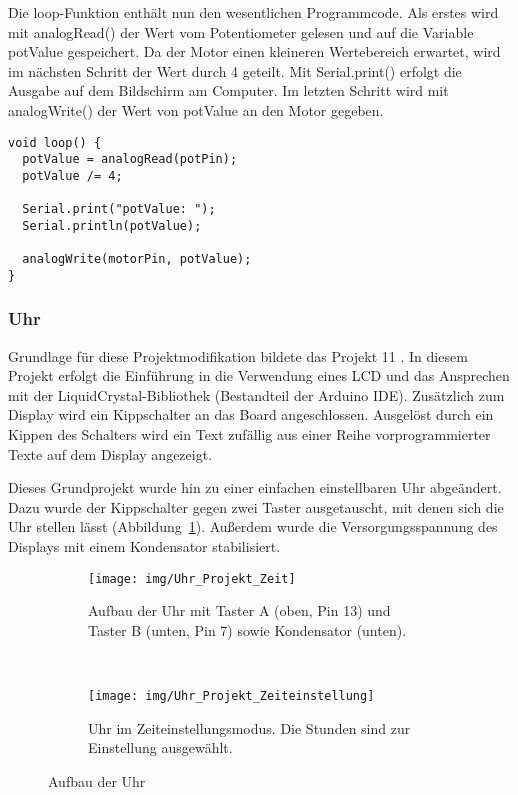 Die loop-Funktion enthält nun den wesentlichen Programmcode. Als erstes wird mit analogRead() der Wert vom Potentiometer gelesen und auf die Variable potValue gespeichert. Da der Motor einen kleineren Wertebereich erwartet, wird im nächsten Schritt der Wert durch 4 geteilt. Mit Serial.print() erfolgt die Ausgabe auf dem Bildschirm am Computer. Im letzten Schritt wird mit analogWrite() der Wert von potValue an den Motor gegeben.
\begin{lstlisting}[language=Arduino]
void loop() {
  potValue = analogRead(potPin);
  potValue /= 4;

  Serial.print("potValue: ");
  Serial.println(potValue);

  analogWrite(motorPin, potValue);
}
\end{lstlisting}


\subsubsection{Uhr}
Grundlage für diese Projektmodifikation bildete das Projekt 11 \autocite{arduino}. In diesem Projekt erfolgt die Einführung in die Verwendung eines LCD und das Ansprechen mit der LiquidCrystal-Bibliothek (Bestandteil der Arduino IDE).
Zusätzlich zum Display wird ein Kippschalter an das Board angeschlossen. Ausgelöst durch ein Kippen des Schalters wird ein Text zufällig aus einer Reihe vorprogrammierter Texte auf dem Display angezeigt.

Dieses Grundprojekt wurde hin zu einer einfachen einstellbaren Uhr abgeändert. Dazu wurde der Kippschalter gegen zwei Taster ausgetauscht, mit denen sich die Uhr stellen lässt (Abbildung~\ref{fig:zeit}). Außerdem wurde die Versorgungsspannung des Displays mit einem Kondensator stabilisiert.

\begin{figure}[p]
    \centering
    \begin{subfigure}[b]{0.6\linewidth}
        \centering
        \texttt{[image: img/Uhr\_Projekt\_Zeit]}
        \caption{Aufbau der Uhr mit Taster A (oben, Pin 13) und Taster B (unten, Pin 7) sowie Kondensator (unten).}\label{fig:zeit}
    \end{subfigure}\enspace%
    \\
    \begin{subfigure}[b]{0.6\linewidth}
        \centering
        \texttt{[image: img/Uhr\_Projekt\_Zeiteinstellung]}
        \caption{Uhr im Zeiteinstellungsmodus. Die Stunden sind zur Einstellung ausgewählt.}\label{fig:zeiteinstell}
    \end{subfigure}
    \caption{Aufbau der Uhr}\label{fig:uhr}
\end{figure}

